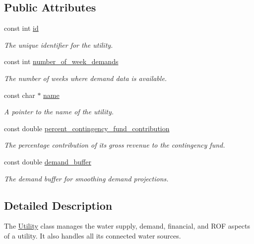 \subsection*{Public Attributes}
\begin{DoxyCompactItemize}
\item 
const int \mbox{\hyperlink{classUtility_ad41c4ea5c911c5000452a3371cd65d5f}{id}}
\begin{DoxyCompactList}\small\item\em The unique identifier for the utility. \end{DoxyCompactList}\item 
const int \mbox{\hyperlink{classUtility_a0548db3746582251082aa430db49dad0}{number\+\_\+of\+\_\+week\+\_\+demands}}
\begin{DoxyCompactList}\small\item\em The number of weeks where demand data is available. \end{DoxyCompactList}\item 
const char $\ast$ \mbox{\hyperlink{classUtility_ad0ce5c179a7f5ceb46d4fcae08dbfb47}{name}}
\begin{DoxyCompactList}\small\item\em A pointer to the name of the utility. \end{DoxyCompactList}\item 
const double \mbox{\hyperlink{classUtility_a7b1a097ec188be8e7175d058b5e6596c}{percent\+\_\+contingency\+\_\+fund\+\_\+contribution}}
\begin{DoxyCompactList}\small\item\em The percentage contribution of its gross revenue to the contingency fund. \end{DoxyCompactList}\item 
const double \mbox{\hyperlink{classUtility_a4be9760339ec06e5c932890da8e566b3}{demand\+\_\+buffer}}
\begin{DoxyCompactList}\small\item\em The demand buffer for smoothing demand projections. \end{DoxyCompactList}\end{DoxyCompactItemize}


\subsection{Detailed Description}
The {\ttfamily \mbox{\hyperlink{classUtility}{Utility}}} class manages the water supply, demand, financial, and R\+OF aspects of a utility. It also handles all its connected water sources. 

